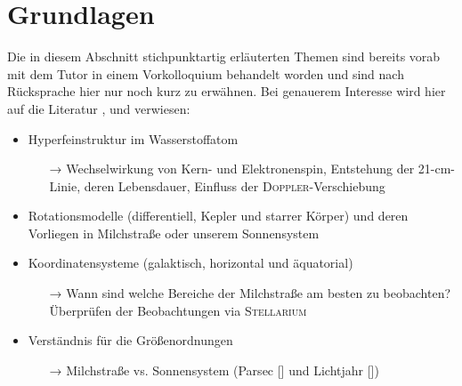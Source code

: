 \section{Grundlagen}
Die in diesem Abschnitt stichpunktartig erläuterten Themen sind bereits vorab mit dem Tutor in einem Vorkolloquium behandelt worden und sind nach Rücksprache hier nur noch kurz zu erwähnen. Bei genauerem Interesse wird hier auf die Literatur \cite{H1}, \cite{Usermanual} und \cite{AntennaResp} verwiesen:
\begin{itemize}
    \item Hyperfeinstruktur im Wasserstoffatom
    \begin{itemize}
        \item[→] Wechselwirkung von Kern- und Elektronenspin, Entstehung der 21-\si{\centi \metre}-Linie, deren Lebensdauer, Einfluss der \textsc{Doppler}-Verschiebung
    \end{itemize}
    \item Rotationsmodelle (differentiell, Kepler und starrer Körper) und deren Vorliegen in Milchstraße oder unserem Sonnensystem
    \item Koordinatensysteme (galaktisch, horizontal und äquatorial)
    \begin{itemize}
        \item[→] Wann sind welche Bereiche der Milchstraße am besten zu beobachten? Überprüfen der Beobachtungen via \textsc{Stellarium} 
    \end{itemize}
    \item Verständnis für die Größenordnungen
    \begin{itemize}
        \item[→] Milchstraße vs. Sonnensystem (Parsec [\si{\parsec}] und Lichtjahr [\si{\lightyear}])
    \end{itemize}
\end{itemize}